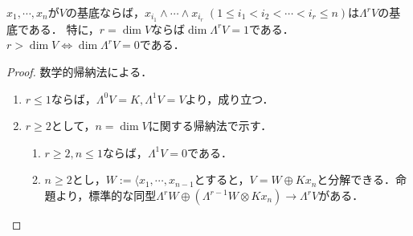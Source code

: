 \documentclass[uplatex, dvipdfmx]{jsreport}
\begin{document}
\begin{corollary}[外積代数の次元]\label{cor-basis-of-exterior-algebra}
    $x_1,\cdots,x_n$が$V$の基底ならば，$x_{i_1}\wedge\cdots\wedge x_{i_r}\;(1\le i_1<i_2<\cdots<i_r\le n)$は$\Lambda^rV$の基底である．
    特に，$r=\dim V$ならば$\dim\Lambda^rV=1$である．$r>\dim V\Leftrightarrow \dim\Lambda^rV=0$である．
\end{corollary}
\begin{proof}
    数学的帰納法による．
    \begin{enumerate}
        \item $r\le 1$ならば，$\Lambda^0V=K,\Lambda^1V=V$より，成り立つ．
        \item $r\ge 2$として，$n=\dim V$に関する帰納法で示す．
        \begin{enumerate}[(1)]
            \item $r\ge 2,n\le 1$ならば，$\Lambda^1V=0$である．
            \item $n\ge 2$とし，$W:=\langle x_1,\cdots,x_{n-1}$とすると，$V=W\oplus Kx_n$と分解できる．命題より，標準的な同型$\Lambda^rW\oplus(\Lambda^{r-1}W\otimes Kx_n)\to\Lambda^rV$がある．
        \end{enumerate}
    \end{enumerate}
\end{proof}
\end{document}
